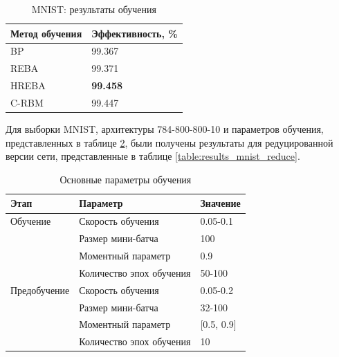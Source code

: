 \documentclass{thesisby}
\begin{document}
\begin{table} [!h]
  \small
  \caption{MNIST: результаты обучения}\label{table:results_mnist}
\centering
\begin{tabular}{| p{6cm} | p{6cm} |}
  \hline
    \textbf{Метод обучения} & \textbf{Эффективность, \%}\\
    \hline
    BP & 99.367\\
    \hline
    REBA & 99.371\\
    \hline
    HREBA & \textbf{99.458}\\
    \hline
    C-RBM & 99.447\\
    \hline
\end{tabular}
\end{table}

Для выборки MNIST, архитектуры 784-800-800-10 и параметров обучения, представленных в таблице \ref{table:params_mnist_reduce}, были получены результаты для редуцированной версии сети, представленные в таблице \ref{table:results_mnist_reduce}.

\begin{table} [h!]
  \small
  \caption{Основные параметры обучения}\label{table:params_mnist_reduce}
\centering
\begin{tabular}{| p{3cm} | p{6cm} | p{2cm} |}
  \hline
    \textbf{Этап} & \textbf{Параметр} & \textbf{Значение}\\
    \hline
    Обучение & Скорость обучения & 0.05-0.1\\
    \cline{2-3}
    & Размер мини-батча & 100 \\
    \cline{2-3}
    & Моментный параметр & 0.9 \\
    \cline{2-3}
    & Количество эпох обучения & 50-100\\
    \hline
    Предобучение & Скорость обучения & 0.05-0.2\\
    \cline{2-3}
    & Размер мини-батча & 32-100 \\
    \cline{2-3}
    & Моментный параметр & [0.5, 0.9] \\
    \cline{2-3}
    & Количество эпох обучения & 10\\
    \hline
\end{tabular}
\end{table}	
	
\end{document}
